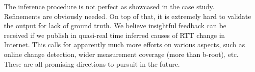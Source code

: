 The inference procedure is not perfect as showcased in the case study. Refinements are obviously needed.
On top of that, it is extremely hard to validate the output for lack of ground truth.
We believe insightful feedback can be received if we publish in quasi-real time inferred causes of RTT change in Internet.
This calls for apparently much more efforts on various aspects, such as online change detection, wider measurement coverage (more than b-root), etc.
These are all promising directions to pursuit in the future.